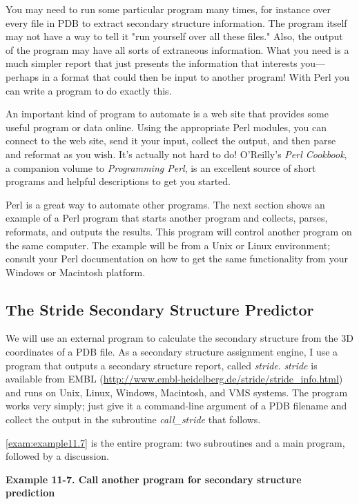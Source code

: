 You may need to run some particular program many times, for instance over every file in PDB to extract secondary structure information. The program itself may not have a way to tell it "run yourself over all these files." Also, the output of the program may have all sorts of extraneous information. What you need is a much simpler report that just presents the information that interests you—perhaps in a format that could then be input to another program! With Perl you can write a program to do exactly this.

An important kind of program to automate is a web site that provides some useful program or data online. Using the appropriate Perl modules, you can connect to the web site, send it your input, collect the output, and then parse and reformat as you wish. It's actually not hard to do!  O'Reilly's \textit{Perl Cookbook}, a companion volume to \textit{Programming Perl}, is an excellent source of short programs and helpful descriptions to get you started.

Perl is a great way to automate other programs. The next section shows an example of a Perl program that starts another program and collects, parses, reformats, and outputs the results. This program will control another program on the same computer. The example will be from a Unix or Linux environment; consult your Perl documentation on how to get the same functionality from your Windows or Macintosh platform. 

\subsection{The Stride Secondary Structure Predictor}
We will use an external program to calculate the secondary structure from the 3D coordinates of a PDB file. As a secondary structure assignment engine, I use a program that outputs a secondary structure report, called \textit{stride}. \textit{stride} is available from EMBL (\href{http://www.embl-heidelberg.de/stride/stride\_info.html}{http://www.embl-heidelberg.de/stride/stride\_info.html}) and runs on Unix, Linux, Windows, Macintosh, and VMS systems. The program works very simply; just give it a command-line argument of a PDB filename and collect the output in the subroutine \textit{call\_stride} that follows.

\autoref{exam:example11.7} is the entire program: two subroutines and a main program, followed by a discussion. 

\textbf{Example 11-7. Call another program for secondary structure prediction}


